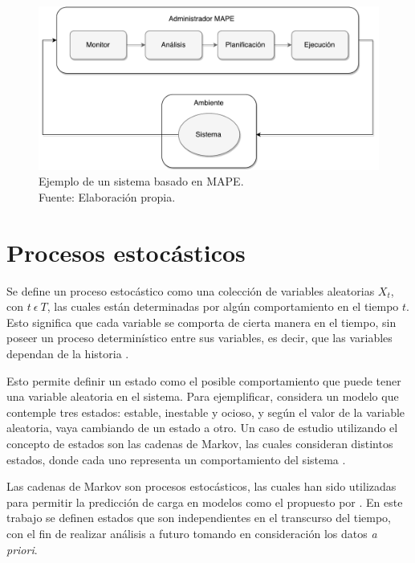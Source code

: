 \begin{figure}[!ht]
	\centering
	\includegraphics[scale=0.55]{images/MAPE.pdf}
	\caption[Ejemplo de un sistema basado en MAPE.]{Ejemplo de un sistema basado en MAPE.\\Fuente: Elaboración propia.}
	\label{fig:mape}
\end{figure}

\section{Procesos estoc\'asticos}
\label{sec:procesosEstocasticos}

Se define un proceso estoc\'astico como una colecci\'on de variables aleatorias {$X_t$, con $t ~ \epsilon ~ T$}, las cuales est\'an determinadas por alg\'un comportamiento en el tiempo $t$. Esto significa que cada variable se comporta de cierta manera en el tiempo, sin poseer un proceso determin\'istico entre sus variables, es decir, que las variables dependan de la historia \citep{taylor2014introduction}.

Esto permite definir un estado como el posible comportamiento que puede tener una variable aleatoria en el sistema. Para ejemplificar, considera un modelo que contemple tres estados: estable, inestable y ocioso, y seg\'un el valor de la variable aleatoria, vaya cambiando de un estado a otro. Un caso de estudio utilizando el concepto de estados son las cadenas de Markov, las cuales consideran distintos estados, donde cada uno representa un comportamiento del sistema \citep{de1978calculus}.

Las cadenas de Markov son procesos estoc\'asticos, las cuales han sido utilizadas para permitir la predicci\'on de carga en modelos como el propuesto por \citep{GongGW10}. En este trabajo se definen estados que son independientes en el transcurso del tiempo, con el fin de realizar an\'alisis a futuro tomando en consideraci\'on los datos \textit{a priori}.

